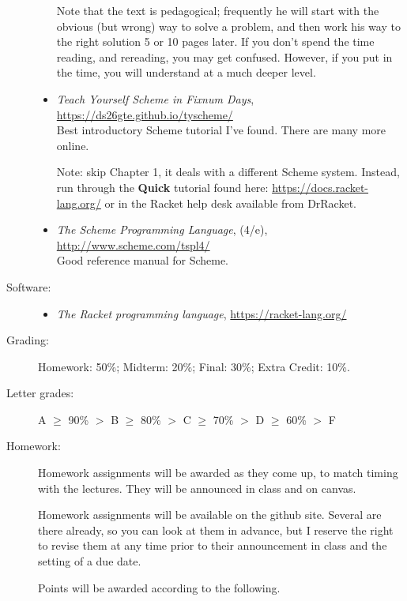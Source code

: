 \documentclass{article}
\newcommand{\myitem}[1]{\item[#1]}
\begin{document}
\begin{description}
\begin{itemize}
Note that the text is pedagogical; frequently he will start
with the obvious (but wrong) way to solve a problem, and then work his
way to the right solution 5 or 10 pages later.  If you don't spend the
time reading, and rereading, you may get confused.  However, if you
put in the time, you will understand at a much deeper level.


\item {\em Teach Yourself Scheme in Fixnum Days}, \\
\url{https://ds26gte.github.io/tyscheme/}\\
Best introductory Scheme tutorial I've found.  There are many
more online.

Note: skip Chapter 1, it deals with a different Scheme system.
Instead, run through the {\bf Quick} tutorial found
here: \url{https://docs.racket-lang.org/} or in
the Racket help desk available from DrRacket.

\item {\em The Scheme Programming Language}, (4/e),\\
\url{http://www.scheme.com/tspl4/}\\
Good reference manual for Scheme.
\end{itemize}

\myitem{Software:} 
\begin{itemize}
\item {\em The Racket programming language}, 
\url{https://racket-lang.org/}
\end{itemize}

\myitem{Grading:}
Homework: 50\%; Midterm: 20\%; Final: 30\%; Extra Credit: 10\%.

\item[Letter grades:]
A $\ge$ 90\% $>$ B $\ge$ 80\% $>$ C $\ge$ 70\% $>$ D $\ge$ 60\% $>$ F

\item[Homework:]  Homework assignments will be awarded as they
come up, to match timing with the lectures.  They will be announced
in class and on canvas.

Homework assignments will be available on the github site.
Several are there already, so you can look at them in advance,
but I reserve the right to revise them at any time prior to
their announcement in class and the setting of a due date.

Points will be awarded according to the
following.



\end{description}
\end{document}
